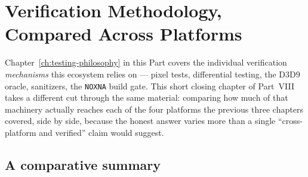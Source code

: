 \chapter{Verification Methodology, Compared Across Platforms}
\label{ch:verification-methodology}

Chapter~\ref{ch:testing-philosophy} in this Part covers the individual verification
\emph{mechanisms} this ecosystem relies on --- pixel tests, differential testing, the D3D9
oracle, sanitizers, the \texttt{NOXNA} build gate. This short closing chapter of Part~VIII takes
a different cut through the same material: comparing how much of that machinery actually
reaches each of the four platforms the previous three chapters covered, side by side, because
the honest answer varies more than a single ``cross-platform and verified'' claim would
suggest.

\section{A comparative summary}

